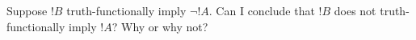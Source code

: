 \documentclass[../../../include/open-logic-section]{subfiles}
\begin{document}


\begin{prob}
\citep[1.1 item 6]{MacFarlane-2020-PhilosophicalLogicContemporary}

Suppose $!B$ truth-functionally imply $\lnot!A$. Can I conclude that
$!B$ does not truth-functionally imply $!A$? Why or why not?

\end{prob}
\end{document}
